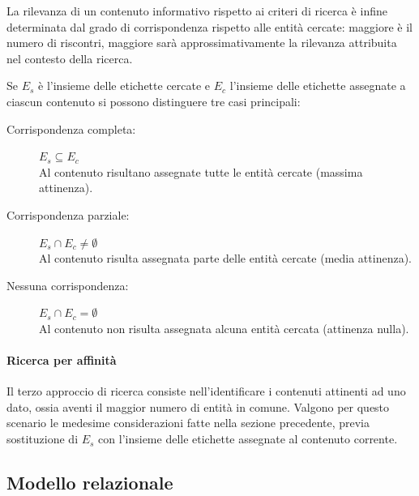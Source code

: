 La rilevanza di un contenuto informativo rispetto ai criteri di ricerca è infine determinata dal grado di corrispondenza rispetto alle entità cercate: maggiore è il numero di riscontri, maggiore sarà approssimativamente la rilevanza attribuita nel contesto della ricerca.

Se $E_s$ è l'insieme delle etichette cercate e $E_c$ l'insieme delle etichette assegnate a ciascun contenuto si possono distinguere tre casi principali:
\begin{description}
\item[Corrispondenza completa:] $E_s \subseteq E_c$ \hfill \\
Al contenuto risultano assegnate tutte le entità cercate (massima attinenza).
\item[Corrispondenza parziale:] $E_s \cap E_c \neq \emptyset$ \hfill \\
Al contenuto risulta assegnata parte delle entità cercate (media attinenza).
\item[Nessuna corrispondenza:] $E_s \cap E_c = \emptyset$\hfill \\
Al contenuto non risulta assegnata alcuna entità cercata (attinenza nulla).
\end{description}

\paragraph{Ricerca per affinità}
Il terzo approccio di ricerca consiste nell'identificare i contenuti attinenti ad uno dato, ossia aventi il maggior numero di entità in comune. Valgono per questo scenario le medesime considerazioni fatte nella sezione precedente, previa sostituzione di $E_s$ con l'insieme delle etichette assegnate al contenuto corrente.

\subsection{Modello relazionale}

